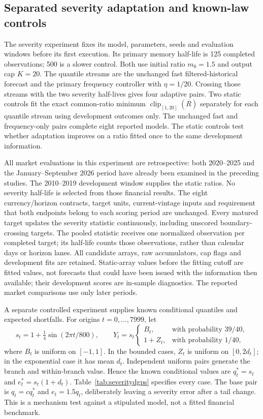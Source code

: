 \documentclass[11pt,a4paper]{article}
\theoremstyle{definition}\newtheorem{definition}[theorem]{Definition}
\begin{document}
\subsection{Separated severity adaptation and known-law controls}\label{sec:severityprotocol}
The severity experiment fixes its model, parameters, seeds and evaluation windows before its first execution. Its primary memory half-life is 125 completed observations; 500 is a slower control. Both use initial ratio $m_0=1.5$ and output cap $K=20$. The quantile streams are the unchanged fast filtered-historical forecast and the primary frequency controller with $\eta=1/20$. Crossing those streams with the two severity half-lives gives four adaptive pairs. Two static controls fit the exact common-ratio minimum $\operatorname{clip}_{[1,20]}(\overline R)$ separately for each quantile stream using development outcomes only. The unchanged fast and frequency-only pairs complete eight reported models. The static controls test whether adaptation improves on a ratio fitted once to the same development information.

All market evaluations in this experiment are retrospective: both 2020--2025 and the January--September 2026 period have already been examined in the preceding studies. The 2010--2019 development window supplies the static ratios. No severity half-life is selected from those financial results. The eight currency/horizon contracts, target units, current-vintage inputs and requirement that both endpoints belong to each scoring period are unchanged. Every matured target updates the severity statistic continuously, including unscored boundary-crossing targets. The pooled statistic receives one normalized observation per completed target; its half-life counts those observations, rather than calendar days or horizon lanes. All candidate arrays, raw accumulators, cap flags and development fits are retained. Static-array values before the fitting cutoff are fitted values, not forecasts that could have been issued with the information then available; their development scores are in-sample diagnostics. The reported market comparisons use only later periods.

A separate controlled experiment supplies known conditional quantiles and expected shortfalls. For origins $t=0,\ldots,7999$, let
\[
 s_t=1+\tfrac14\sin(2\pi t/800),\qquad
 Y_t=s_t\begin{cases} B_t,&\text{with probability }39/40,\\
 1+Z_t,&\text{with probability }1/40,
 \end{cases}
\]
where $B_t$ is uniform on $[-1,1]$. In the bounded cases, $Z_t$ is uniform on $[0,2d_t]$; in the exponential case it has mean $d_t$. Independent uniform pairs generate the branch and within-branch value. Hence the known conditional values are $q_t^*=s_t$ and $e_t^*=s_t(1+d_t)$. Table~\ref{tab:severitydgps} specifies every case. The base pair is $q_t=cq_t^*$ and $e_t=1.5q_t$, deliberately leaving a severity error after a tail change. This is a mechanism test against a stipulated model, not a fitted financial benchmark.
\end{document}
